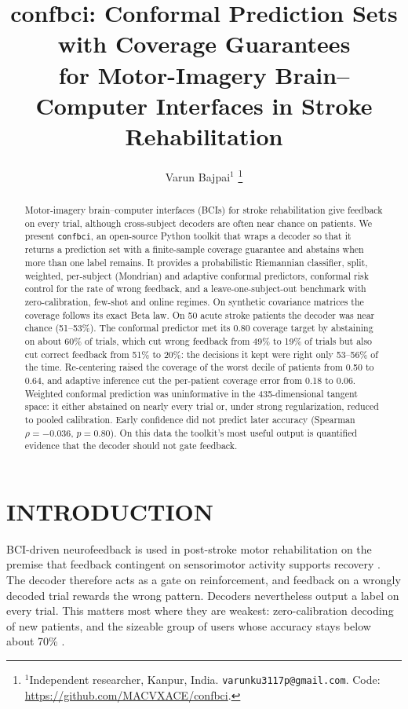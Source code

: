 \documentclass[letterpaper, 10pt, conference]{ieeeconf}
\title{\LARGE \bf confbci: Conformal Prediction Sets with Coverage Guarantees\\
for Motor-Imagery Brain--Computer Interfaces in Stroke Rehabilitation}
\author{Varun Bajpai$^{1}$%
\thanks{$^{1}$Independent researcher, Kanpur, India. \texttt{varunku3117p@gmail.com}. Code:
\protect\url{https://github.com/MACVXACE/confbci}.}}
\begin{document}
\maketitle
\thispagestyle{empty}
\pagestyle{empty}

\begin{abstract}
Motor-imagery brain--computer interfaces (BCIs) for stroke rehabilitation give
feedback on every trial, although cross-subject decoders are often near chance on
patients. We present \texttt{confbci}, an open-source Python toolkit that wraps a
decoder so that it returns a prediction set with a finite-sample coverage
guarantee and abstains when more than one label remains. It provides a
probabilistic Riemannian classifier, split, weighted, per-subject (Mondrian) and
adaptive conformal predictors, conformal risk control for the rate of wrong
feedback, and a leave-one-subject-out benchmark with zero-calibration, few-shot
and online regimes. On synthetic covariance matrices the coverage follows its
exact Beta law. On 50 acute stroke patients the decoder was near chance
(51--53\%). The conformal predictor met its 0.80 coverage target by abstaining
on about 60\% of trials, which cut wrong feedback from 49\% to 19\% of trials
but also cut correct feedback from 51\% to 20\%: the decisions it kept were
right only 53--56\% of the time. Re-centering raised the coverage of the worst
decile of patients from 0.50 to 0.64, and adaptive inference cut the
per-patient coverage error from 0.18 to 0.06. Weighted conformal prediction
was uninformative in the 435-dimensional tangent space: it either abstained on nearly every
trial or, under strong regularization, reduced to pooled calibration. Early
confidence did not predict later accuracy (Spearman $\rho=-0.036$, $p=0.80$). On
this data the toolkit's most useful output is quantified evidence that the
decoder should not gate feedback.
\end{abstract}

\section{INTRODUCTION}
BCI-driven neurofeedback is used in post-stroke motor rehabilitation on the
premise that feedback contingent on sensorimotor activity supports recovery
\cite{cervera2018}. The decoder therefore acts as a gate on reinforcement, and
feedback on a wrongly decoded trial rewards the wrong pattern. Decoders
nevertheless output a label on every trial. This matters most where they are
weakest: zero-calibration decoding of new patients, and the sizeable group of
users whose accuracy stays below about 70\% \cite{blankertz2010}.
\end{document}

